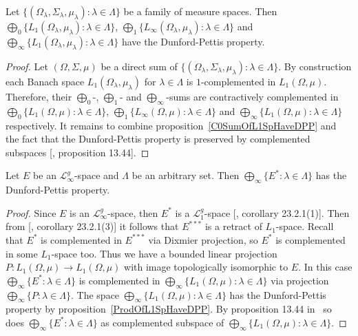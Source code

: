 \begin{proposition}\label{ProdOfL1SpHaveDPP} Let $
\{(\Omega_\lambda,\Sigma_\lambda,\mu_\lambda):\lambda\in\Lambda \}$ be a family
of measure spaces. 
Then 
$\bigoplus_0 \{
    L_1(\Omega_\lambda, \mu_\lambda):\lambda\in\Lambda
 \}$, 
 $\bigoplus_1 \{
     L_\infty(\Omega_\lambda, \mu_\lambda):\lambda\in\Lambda
 \}$ 
and $\bigoplus_\infty \{
    L_1(\Omega_\lambda,\mu_\lambda):\lambda\in\Lambda
 \}$ have the Dunford-Pettis property.
\end{proposition}
\begin{proof} Let $(\Omega, \Sigma, \mu)$ be a direct sum of $
\{(\Omega_\lambda,\Sigma_\lambda,\mu_\lambda):\lambda\in\Lambda \}$. By
construction each Banach space $L_1(\Omega_\lambda,\mu_\lambda)$ for
$\lambda\in\Lambda$ is $1$-complemented in $L_1(\Omega, \mu)$. Therefore, their
$\bigoplus_0$-, $\bigoplus_1$- and $\bigoplus_\infty$-sums are contractively
complemented in $\bigoplus_0 \{L_1(\Omega, \mu):\lambda\in\Lambda \}$,
$\bigoplus_1 \{L_\infty(\Omega, \mu):\lambda\in\Lambda \}$ 
and $\bigoplus_\infty \{L_1(\Omega,\mu):\lambda\in\Lambda \}$ respectively. 
It remains to combine proposition~\ref{C0SumOfL1SpHaveDPP} and the fact 
that the Dunford-Pettis property is preserved by complemented 
subspaces [\cite{FabHabBanSpTh}, proposition 13.44].
\end{proof}

\begin{proposition}\label{ProdOfDualsOfMthscrLInftySpHaveDPP} Let $E$ be an
$\mathscr{L}_\infty^g$-space and $\Lambda$ be an arbitrary set. Then
$\bigoplus_\infty \{E^*:\lambda\in\Lambda \}$ has the Dunford-Pettis property.
\end{proposition}
\begin{proof} Since $E$ is an $\mathscr{L}_\infty^g$-space, then $E^*$ is a
$\mathscr{L}_{1}^g$-space [\cite{DefFloTensNorOpId}, corollary 23.2.1(1)]. Then
from [\cite{DefFloTensNorOpId}, corollary 23.2.1(3)] it follows that $E^{***}$
is a retract of $L_1$-space. Recall that $E^*$ is complemented in $E^{***}$ via
Dixmier projection, so $E^*$ is complemented in some $L_1$-space too. Thus we
have a bounded linear projection $P:L_1(\Omega,\mu)\to L_1(\Omega,\mu)$ with
image topologically isomorphic to $E$. In this 
case $\bigoplus_\infty \{E^*:\lambda\in\Lambda \}$ is complemented 
in $\bigoplus_\infty \{ L_1(\Omega,\mu):\lambda\in\Lambda \}$ via 
projection $\bigoplus_\infty \{P:\lambda\in\Lambda \}$. The 
space $\bigoplus_\infty \{ L_1(\Omega,\mu):\lambda\in\Lambda \}$ has 
the Dunford-Pettis property by proposition~\ref{ProdOfL1SpHaveDPP}. By 
proposition 13.44 in~\cite{FabHabBanSpTh} so does 
$\bigoplus_\infty \{ E^*:\lambda\in\Lambda \}$ as complemented subspace 
of $\bigoplus_\infty \{ L_1(\Omega,\mu):\lambda\in\Lambda \}$.
\end{proof}

